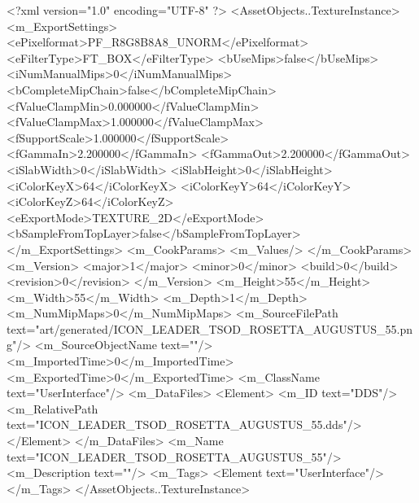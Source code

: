 <?xml version="1.0" encoding="UTF-8" ?>
<AssetObjects..TextureInstance>
	<m_ExportSettings>
		<ePixelformat>PF_R8G8B8A8_UNORM</ePixelformat>
		<eFilterType>FT_BOX</eFilterType>
		<bUseMips>false</bUseMips>
		<iNumManualMips>0</iNumManualMips>
		<bCompleteMipChain>false</bCompleteMipChain>
		<fValueClampMin>0.000000</fValueClampMin>
		<fValueClampMax>1.000000</fValueClampMax>
		<fSupportScale>1.000000</fSupportScale>
		<fGammaIn>2.200000</fGammaIn>
		<fGammaOut>2.200000</fGammaOut>
		<iSlabWidth>0</iSlabWidth>
		<iSlabHeight>0</iSlabHeight>
		<iColorKeyX>64</iColorKeyX>
		<iColorKeyY>64</iColorKeyY>
		<iColorKeyZ>64</iColorKeyZ>
		<eExportMode>TEXTURE_2D</eExportMode>
		<bSampleFromTopLayer>false</bSampleFromTopLayer>
	</m_ExportSettings>
	<m_CookParams>
		<m_Values/>
	</m_CookParams>
	<m_Version>
		<major>1</major>
		<minor>0</minor>
		<build>0</build>
		<revision>0</revision>
	</m_Version>
	<m_Height>55</m_Height>
	<m_Width>55</m_Width>
	<m_Depth>1</m_Depth>
	<m_NumMipMaps>0</m_NumMipMaps>
	<m_SourceFilePath text="art/generated/ICON_LEADER_TSOD_ROSETTA_AUGUSTUS_55.png"/>
	<m_SourceObjectName text=""/>
	<m_ImportedTime>0</m_ImportedTime>
	<m_ExportedTime>0</m_ExportedTime>
	<m_ClassName text="UserInterface"/>
	<m_DataFiles>
		<Element>
			<m_ID text="DDS"/>
			<m_RelativePath text="ICON_LEADER_TSOD_ROSETTA_AUGUSTUS_55.dds"/>
		</Element>
	</m_DataFiles>
	<m_Name text="ICON_LEADER_TSOD_ROSETTA_AUGUSTUS_55"/>
	<m_Description text=""/>
	<m_Tags>
		<Element text="UserInterface"/>
	</m_Tags>
</AssetObjects..TextureInstance>
